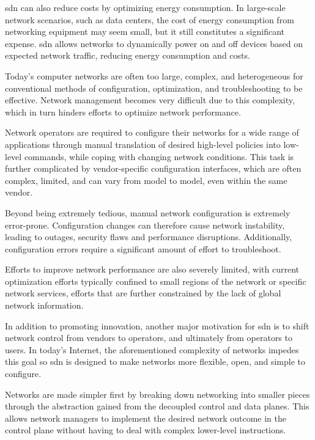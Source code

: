 \gls{sdn} can also reduce costs by optimizing energy consumption. In large-scale network scenarios, such as data centers, the cost of energy consumption from networking equipment may seem small, but it still constitutes a significant expense. \gls{sdn} allows networks to dynamically power on and off devices based on expected network traffic, reducing energy consumption and costs\cite{nunes_survey_2014}.


Today's computer networks are often too large, complex, and heterogeneous for conventional methods of configuration, optimization, and troubleshooting to be effective\cite{xia_survey_2015}\cite{kreutz_software-defined_2015}. Network management becomes very difficult due to this complexity, which in turn hinders efforts to optimize network performance.

Network operators are required to configure their networks for a wide range of applications through manual translation of desired high-level policies into low-level commands, while coping with changing network conditions. This task is further complicated by vendor-specific configuration interfaces, which are often complex, limited, and can vary from model to model, even within the same vendor\cite{feamster_road_2013}. 

Beyond being extremely tedious, manual network configuration is extremely error-prone. Configuration changes can therefore cause network instability, leading to outages, security flaws and performance disruptions\cite{nunes_survey_2014}. Additionally, configuration errors require a significant amount of effort to troubleshoot. 

Efforts to improve network performance are also severely limited, with current optimization efforts typically confined to small regions of the network or specific network services, efforts that are further constrained by the lack of global network information\cite{xia_survey_2015}.

In addition to promoting innovation, another major motivation for \gls{sdn} is to shift network control from vendors to operators, and ultimately from operators to users\cite{peterson_software-defined_2021}. In today's Internet, the aforementioned complexity of networks impedes this goal so \gls{sdn} is designed to make networks more flexible, open, and simple to configure.

Networks are made simpler first by breaking down networking into smaller pieces through the abstraction gained from the decoupled control and data planes. This allows network managers to implement the desired network outcome in the control plane without having to deal with complex lower-level instructions.

